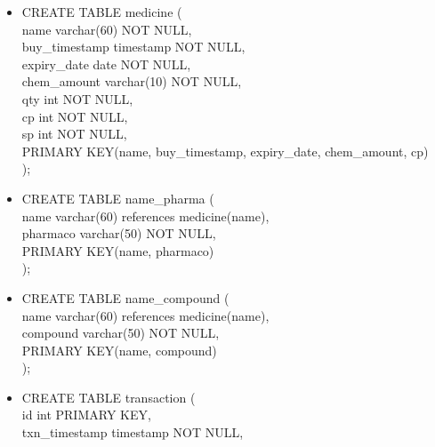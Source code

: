\documentclass[a4papaer]{article}
\begin{document}
	\begin{itemize}
		\item CREATE TABLE medicine (\\
			\hspace*{4mm}name varchar(60) NOT NULL,\\
			\hspace*{4mm}buy\_timestamp timestamp NOT NULL,\\
			\hspace*{4mm}expiry\_date date NOT NULL,\\
			\hspace*{4mm}chem\_amount varchar(10) NOT NULL,\\
			\hspace*{4mm}qty int NOT NULL,\\
			\hspace*{4mm}cp int NOT NULL,\\
			\hspace*{4mm}sp int NOT NULL,\\
			\hspace*{4mm}PRIMARY KEY(name, buy\_timestamp, expiry\_date, chem\_amount, cp)\\
		);
		\item CREATE TABLE name\_pharma (\\
			\hspace*{4mm}name varchar(60) references medicine(name),\\
			\hspace*{4mm}pharmaco varchar(50) NOT NULL,\\
			\hspace*{4mm}PRIMARY KEY(name, pharmaco)\\
		);
		\item CREATE TABLE name\_compound (\\
			\hspace*{4mm}name varchar(60) references medicine(name),\\
			\hspace*{4mm}compound varchar(50) NOT NULL,\\
			\hspace*{4mm}PRIMARY KEY(name, compound)\\
		);
		\item CREATE TABLE transaction (\\
			\hspace*{4mm}id int PRIMARY KEY,\\
			\hspace*{4mm}txn\_timestamp timestamp NOT NULL,\\

\end{itemize}
\end{document}

